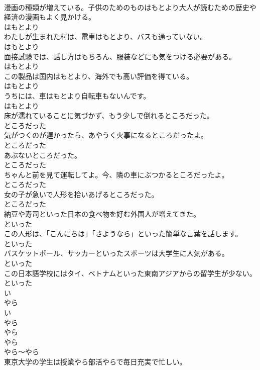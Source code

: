\documentclass[8pt]{extreport}
\begin{document}
\begin{CJK}{UTF8}{min}
\\	漫画の種類が増えている。子供のためのものはもとより大人が読むための歴史や経済の漫画もよく見かける。	
\\	はもとより	
\\	わたしが生まれた村は、電車はもとより、バスも通っていない。	
\\	はもとより	
\\	面接試験では、話し方はもちろん、服装などにも気をつける必要がある。	
\\	はもとより	
\\	この製品は国内はもとより、海外でも高い評価を得ている。	
\\	はもとより	
\\	うちには、車はもとより自転車もないんです。	
\\	はもとより	
\\	床が濡れていることに気づかず、もう少しで倒れるところだった。	
\\	ところだった	
\\	気がつくのが遅かったら、あやうく火事になるところだったよ。	
\\	ところだった	
\\	あぶないところだった。	
\\	ところだった	
\\	ちゃんと前を見て運転してよ。今、隣の車にぶつかるところだったよ。	
\\	ところだった	
\\	女の子が急いで人形を拾いあげるところだった。	
\\	ところだった	
\\	納豆や寿司といった日本の食べ物を好む外国人が増えてきた。	
\\	といった	
\\	この人形は、「こんにちは」「さようなら」といった簡単な言葉を話します。	
\\	といった	
\\	バスケットボール、サッカーといったスポーツは大学生に人気がある。	
\\	といった	
\\	この日本語学校にはタイ、ベトナムといった東南アジアからの留学生が少ない。	
\\	といった	
\\	い
\\	やら 
\\	い
\\	やら 
\\	やら	
\\	やら 
\\	やら～やら	
\\	東京大学の学生は授業やら部活やらで毎日充実で忙しい。	

\end{CJK}
\end{document}
